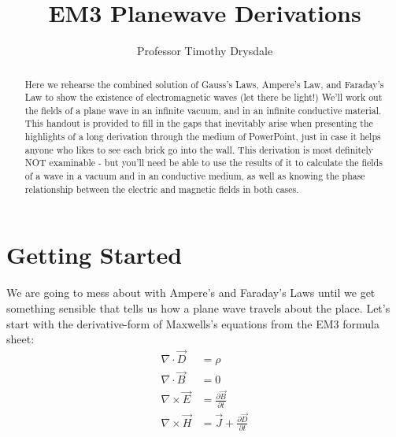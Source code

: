 \documentclass{tufte-handout}
\title{EM3 Planewave Derivations}
\author{Professor Timothy Drysdale}
\begin{document}
\maketitle

\begin{abstract}
\noindent
Here we rehearse the combined solution of Gauss's Laws, Ampere's Law, and Faraday's Law to show the existence of electromagnetic waves (let there be light!) We'll work out the fields of a plane wave in an infinite vacuum, and in an infinite conductive material. This handout is provided to fill in the gaps that inevitably arise when presenting the highlights of a long derivation through the medium of PowerPoint, just in case it helps anyone who likes to see each brick go into the wall. This derivation is most definitely NOT examinable - but you'll need be able to use the results of it to calculate the fields of a wave in a vacuum and in an conductive medium, as well as knowing the phase relationship between the electric and magnetic fields in both cases.
\end{abstract}

\section{Getting Started}

We are going to mess about with Ampere's and Faraday's Laws until we get something sensible that tells us how a plane wave travels about the place. Let's start with the derivative-form of Maxwells's equations from the EM3 formula sheet:
\begin{align}
\nabla\cdot\vec{D} & = \rho \label{eq:gaussE}\\
\nabla\cdot\vec{B }& = 0 \label{eq:gaussM}\\
\nabla\times\vec{E} & = \frac{\partial\vec{B}}{\partial t} \label{eq:Ab}\\
\nabla\times\vec{H} & = \vec{J} + \frac{\partial\vec{D}}{\partial t} \label{eq:Fd}
\end{align}
\end{document}
